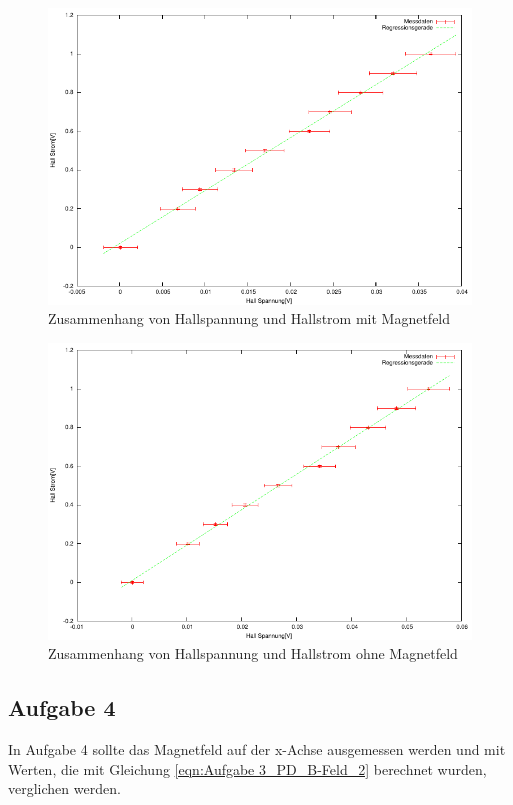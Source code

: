 \documentclass[12pt]{scrartcl}
\begin{document}
\begin{figure}[htbp] 
  \centering
    \includegraphics[scale = 1.3]{aufgabe_3_e_m.pdf}
  	\caption[Zusammenhang von Hallspannung und Hallstrom mit Magnetfeld]{Zusammenhang von Hallspannung und Hallstrom mit Magnetfeld}
  \label{fig:kasten}
\end{figure}

\begin{figure}[htbp] 
  \centering
    \includegraphics[scale = 1.3]{aufgabe_3_e_o.pdf}
  	\caption[Zusammenhang von Hallspannung und Hallstrom ohne Magnetfeld]{Zusammenhang von Hallspannung und Hallstrom ohne Magnetfeld}
  \label{fig:kasten}
\end{figure}

\newpage

\subsection{Aufgabe 4}
In Aufgabe 4 sollte das Magnetfeld auf der x-Achse ausgemessen werden und mit Werten, die mit Gleichung \ref{eqn:Aufgabe 3_PD_B-Feld_2} berechnet wurden, verglichen werden.
\end{document}
